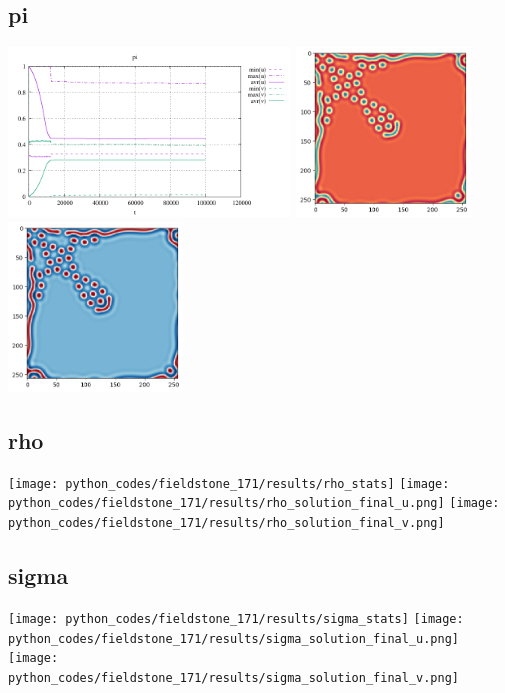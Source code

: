 \subsection*{pi}
\begin{center}
\includegraphics[height=4.5cm]{python_codes/fieldstone_171/results/pi_stats}
\includegraphics[height=4.5cm]{python_codes/fieldstone_171/results/pi_solution_final_u.png}
\includegraphics[height=4.5cm]{python_codes/fieldstone_171/results/pi_solution_final_v.png}
\end{center}

\subsection*{rho}
\begin{center}
\texttt{[image: python\_codes/fieldstone\_171/results/rho\_stats]}
\texttt{[image: python\_codes/fieldstone\_171/results/rho\_solution\_final\_u.png]}
\texttt{[image: python\_codes/fieldstone\_171/results/rho\_solution\_final\_v.png]}
\end{center}

\subsection*{sigma}
\begin{center}
\texttt{[image: python\_codes/fieldstone\_171/results/sigma\_stats]}
\texttt{[image: python\_codes/fieldstone\_171/results/sigma\_solution\_final\_u.png]}
\texttt{[image: python\_codes/fieldstone\_171/results/sigma\_solution\_final\_v.png]}
\end{center}









